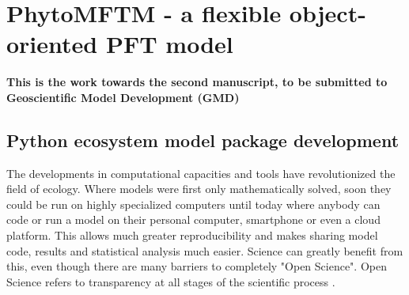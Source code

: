 \chapter{PhytoMFTM - a flexible object-oriented PFT model}

\small {\textbf{This is the work towards the second manuscript, to be submitted to Geoscientific Model Development (GMD)}}


\normalsize
\section{Python ecosystem model package development} %
The developments in computational capacities and tools have revolutionized the field of ecology. Where models were first only mathematically solved, soon they could be run on highly specialized computers until today where anybody can code or run a model on their personal computer, smartphone or even a cloud platform. This allows much greater reproducibility and makes sharing model code, results and statistical analysis much easier. Science can greatly benefit from this, even though there are many barriers to completely "Open Science". Open Science refers to transparency at all stages of the scientific process \citep{Hampton2015}.

